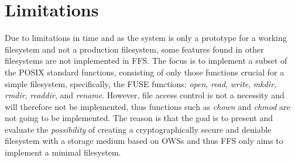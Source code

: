 \section{Limitations} %
\label{sec:delim}

Due to limitations in time and as the system is only a prototype for a working filesystem and not a production filesystem, some features found in other filesystems are not implemented in \gls{FFS}. The focus is to implement a subset of the POSIX standard functions, consisting of only those  functions crucial for a simple filesystem, specifically, the \gls{FUSE} functions: \textit{open}, \textit{read}, \textit{write}, \textit{mkdir}, \textit{rmdir}, \textit{readdir}, and \textit{rename}. However, file access control is not a necessity and will therefore not be implemented, thus functions such as \textit{chown} and \textit{chmod} are not going to be implemented. The reason is that the goal is to present and evaluate the \textit{possibility} of creating a cryptographically secure and deniable filesystem with a storage medium based on \glspl{OWS} and thus \gls{FFS} only aims to implement a minimal filesystem.